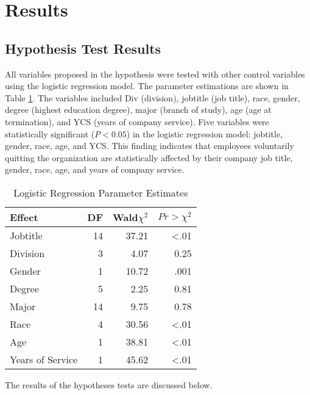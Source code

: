 \section{Results}
\subsection{Hypothesis Test Results}

All variables proposed in the hypothesis were tested with other control variables using the logistic regression model. The parameter estimations are shown in Table \ref{tab:logitpar}. The variables included Div (division), jobtitle (job title), race, gender, degree (highest education degree), major (branch of study), age (age at termination), and YCS (years of company service). Five variables were statistically significant ($P<0.05$) in the logistic regression model: jobtitle, gender, race, age, and YCS. This finding indicates that employees voluntarily quitting the organization are statistically affected by their company job title, gender, race, age, and years of company service.

\begin{table}[http]
	\centering
	\caption{Logistic Regression Parameter Estimates}
	\label{tab:logitpar}
	\begin{tabular}{lrrr}
		\toprule
		Effect           & DF & Wald$\chi^2$ & $Pr>\chi^2 $ \\
		\midrule
		Jobtitle         & 14 & 37.21                    & \textless.01                     \\
		Division         & 3  & 4.07                     & 0.25                               \\
		Gender           & 1  & 10.72                    &  .001                              \\
		Degree           & 5  & 2.25                     & 0.81                               \\
		Major            & 14 & 9.75                     & 0.78                               \\
		Race             & 4  & 30.56                    & \textless.01                      \\
		Age              & 1  & 38.81                    & \textless.01                      \\
		Years of Service & 1  & 45.62                    & \textless.01     \\
		\bottomrule                
	\end{tabular}
\end{table}
The results of the hypotheses tests are discussed below.

